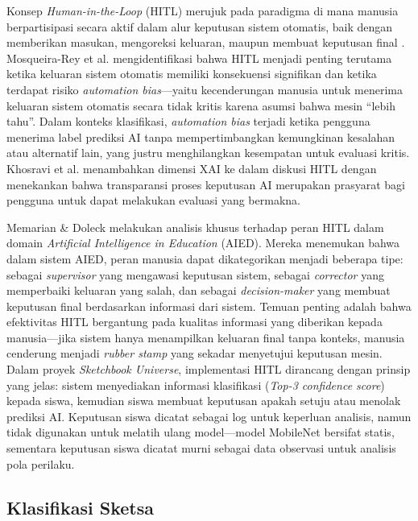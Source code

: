 \documentclass[12pt,a4paper,oneside,openany]{report}
\begin{document}
Konsep \textit{Human-in-the-Loop} (HITL) merujuk pada paradigma di mana manusia berpartisipasi secara aktif dalam alur keputusan sistem otomatis, baik dengan memberikan masukan, mengoreksi keluaran, maupun membuat keputusan final \cite{ref4}. Mosqueira-Rey et al. \cite{ref4} mengidentifikasi bahwa HITL menjadi penting terutama ketika keluaran sistem otomatis memiliki konsekuensi signifikan dan ketika terdapat risiko \textit{automation bias}---yaitu kecenderungan manusia untuk menerima keluaran sistem otomatis secara tidak kritis karena asumsi bahwa mesin ``lebih tahu''. Dalam konteks klasifikasi, \textit{automation bias} terjadi ketika pengguna menerima label prediksi AI tanpa mempertimbangkan kemungkinan kesalahan atau alternatif lain, yang justru menghilangkan kesempatan untuk evaluasi kritis. Khosravi et al. \cite{ref3} menambahkan dimensi XAI ke dalam diskusi HITL dengan menekankan bahwa transparansi proses keputusan AI merupakan prasyarat bagi pengguna untuk dapat melakukan evaluasi yang bermakna.

Memarian \& Doleck \cite{ref5} melakukan analisis khusus terhadap peran HITL dalam domain \textit{Artificial Intelligence in Education} (AIED). Mereka menemukan bahwa dalam sistem AIED, peran manusia dapat dikategorikan menjadi beberapa tipe: sebagai \textit{supervisor} yang mengawasi keputusan sistem, sebagai \textit{corrector} yang memperbaiki keluaran yang salah, dan sebagai \textit{decision-maker} yang membuat keputusan final berdasarkan informasi dari sistem. Temuan penting adalah bahwa efektivitas HITL bergantung pada kualitas informasi yang diberikan kepada manusia---jika sistem hanya menampilkan keluaran final tanpa konteks, manusia cenderung menjadi \textit{rubber stamp} yang sekadar menyetujui keputusan mesin. Dalam proyek \textit{Sketchbook Universe}, implementasi HITL dirancang dengan prinsip yang jelas: sistem menyediakan informasi klasifikasi (\textit{Top-3 confidence score}) kepada siswa, kemudian siswa membuat keputusan apakah setuju atau menolak prediksi AI. Keputusan siswa dicatat sebagai log untuk keperluan analisis, namun tidak digunakan untuk melatih ulang model---model MobileNet bersifat statis, sementara keputusan siswa dicatat murni sebagai data observasi untuk analisis pola perilaku.

\subsection{Klasifikasi Sketsa}
\label{subsec:klasifikasi-sketsa}
\end{document}
